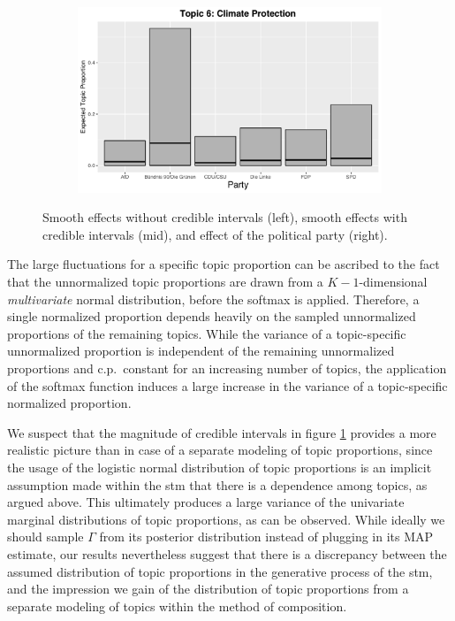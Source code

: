 \begin{figure}[h!]
\begin{subfigure}[b]{0.3\linewidth}
    \includegraphics[width=\linewidth]{../plots/4_4/direct_t6_cat.pdf}
  \end{subfigure}
  \caption{Smooth effects without credible intervals (left), smooth effects with credible intervals (mid), and effect of the political party (right).}
  \label{fig:directassessment}
\end{figure}

The large fluctuations for a specific topic proportion can be ascribed to the fact that the unnormalized topic proportions are drawn from a $K-1$-dimensional \textit{multivariate} normal distribution, before the softmax is applied. Therefore, a single normalized proportion depends heavily on the sampled unnormalized proportions of the remaining topics. While the variance of a topic-specific unnormalized proportion is independent of the remaining unnormalized proportions and c.p.\ constant for an increasing number of topics, the application of the softmax function induces a large increase in the variance of a topic-specific normalized proportion.

We suspect that the magnitude of credible intervals in figure \ref{fig:directassessment} provides a more realistic picture than in case of a separate modeling of topic proportions, since the usage of the logistic normal distribution of topic proportions is an implicit assumption made within the stm that there is a dependence among topics, as argued above. This ultimately produces a large variance of the univariate marginal distributions of topic proportions, as can be observed. While ideally we should sample $\Gamma$ from its posterior distribution instead of plugging in its MAP estimate, our results nevertheless suggest that there is a discrepancy between the assumed distribution of topic proportions in the generative process of the stm, and the impression we gain of the distribution of topic proportions from a separate modeling of topics within the method of composition.

